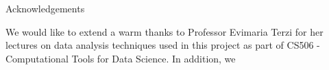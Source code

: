 \documentclass[final]{beamer}
\newlength{\sepwid}
\newlength{\onecolwid}
\begin{document}
\begin{frame}[t]
\begin{columns}[t]
\begin{column}{\onecolwid}


\begin{block}{Acknowledgements}

We would like to extend a warm thanks to Professor Evimaria Terzi for her lectures on data analysis techniques used in this project as part of CS506 - Computational Tools for Data Science.
In addition, we 
\newline

\end{block}






\end{column} %
\begin{column}{\sepwid}\end{column} %

\end{columns} %

\vspace*{\fill}

\end{frame} %
\end{document}

